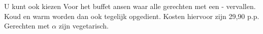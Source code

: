 U kunt ook kiezen Voor het buffet ansen waar alle gerechten met een - vervallen. 
Koud en warm worden dan ook tegelijk opgedient. Kosten hiervoor zijn 29,90 p.p. Gerechten met  $\alpha$ zijn vegetarisch.
